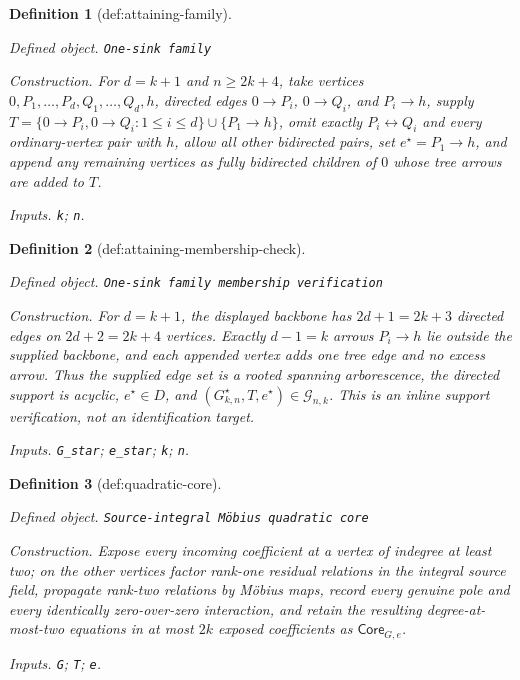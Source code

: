\documentclass{article}
\newtheorem{definition}{Definition}
\begin{document}
\begin{definition}[def:attaining-family]\label{def:attaining-family}
\par\smallskip\noindent\emph{Defined object.} \texttt{One-\allowbreak{}sink family}
\par\smallskip\noindent\emph{Construction.} For \(d=k+1\) and \(n\ge2k+4\), take vertices \(0,P_1,\ldots,P_d,Q_1,\ldots,Q_d,h\), directed edges \(0\to P_i\), \(0\to Q_i\), and \(P_i\to h\), supply \(T=\{0\to P_i,0\to Q_i:1\le i\le d\}\cup\{P_1\to h\}\), omit exactly \(P_i\leftrightarrow Q_i\) and every ordinary-vertex pair with \(h\), allow all other bidirected pairs, set \(e^{\star}=P_1\to h\), and append any remaining vertices as fully bidirected children of \(0\) whose tree arrows are added to \(T\).
\par\smallskip\noindent\emph{Inputs.} \texttt{k}; \texttt{n}.
\end{definition}

\begin{definition}[def:attaining-membership-check]\label{def:attaining-membership-check}
\par\smallskip\noindent\emph{Defined object.} \texttt{One-\allowbreak{}sink family membership verification}
\par\smallskip\noindent\emph{Construction.} For \(d=k+1\), the displayed backbone has \(2d+1=2k+3\) directed edges on \(2d+2=2k+4\) vertices. Exactly \(d-1=k\) arrows \(P_i\to h\) lie outside the supplied backbone, and each appended vertex adds one tree edge and no excess arrow. Thus the supplied edge set is a rooted spanning arborescence, the directed support is acyclic, \(e^{\star}\in D\), and \((G^{\star}_{k,n},T,e^{\star})\in\mathcal G_{n,k}\). This is an inline support verification, not an identification target.
\par\smallskip\noindent\emph{Inputs.} \texttt{G\_\allowbreak{}star}; \texttt{e\_\allowbreak{}star}; \texttt{k}; \texttt{n}.
\end{definition}

\begin{definition}[def:quadratic-core]\label{def:quadratic-core}
\par\smallskip\noindent\emph{Defined object.} \texttt{Source-\allowbreak{}integral Möbius quadratic core}
\par\smallskip\noindent\emph{Construction.} Expose every incoming coefficient at a vertex of indegree at least two; on the other vertices factor rank-one residual relations in the integral source field, propagate rank-two relations by Möbius maps, record every genuine pole and every identically zero-over-zero interaction, and retain the resulting degree-at-most-two equations in at most \(2k\) exposed coefficients as \(\mathsf{Core}_{G,e}\).
\par\smallskip\noindent\emph{Inputs.} \texttt{G}; \texttt{T}; \texttt{e}.
\end{definition}
\end{document}
